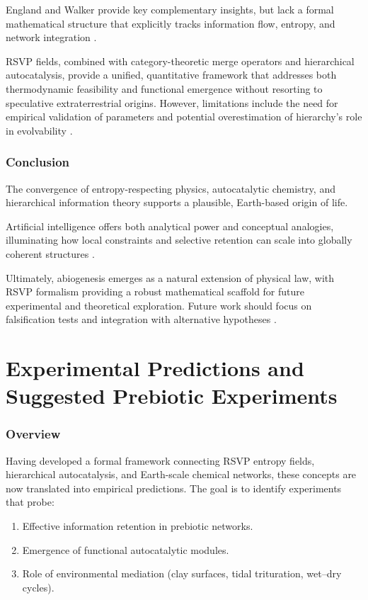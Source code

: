 \documentclass{book}
\begin{document}
England and Walker provide key complementary insights, but lack a formal mathematical structure that explicitly tracks information flow, entropy, and network integration \citep{england2015, walker2017}.

RSVP fields, combined with category-theoretic merge operators and hierarchical autocatalysis, provide a unified, quantitative framework that addresses both thermodynamic feasibility and functional emergence without resorting to speculative extraterrestrial origins. However, limitations include the need for empirical validation of parameters and potential overestimation of hierarchy's role in evolvability \citep{vasas2010}.

\section{Conclusion}
The convergence of entropy-respecting physics, autocatalytic chemistry, and hierarchical information theory supports a plausible, Earth-based origin of life.

Artificial intelligence offers both analytical power and conceptual analogies, illuminating how local constraints and selective retention can scale into globally coherent structures \citep{day2024}.

Ultimately, abiogenesis emerges as a natural extension of physical law, with RSVP formalism providing a robust mathematical scaffold for future experimental and theoretical exploration. Future work should focus on falsification tests and integration with alternative hypotheses \citep{deamer2017}.

\part{Experimental Predictions and Suggested Prebiotic Experiments}

\section{Overview}
Having developed a formal framework connecting RSVP entropy fields, hierarchical autocatalysis, and Earth-scale chemical networks, these concepts are now translated into empirical predictions. The goal is to identify experiments that probe:

\begin{enumerate}
\item Effective information retention in prebiotic networks.
\item Emergence of functional autocatalytic modules.
\item Role of environmental mediation (clay surfaces, tidal trituration, wet–dry cycles).
\end{enumerate}
\end{document}
